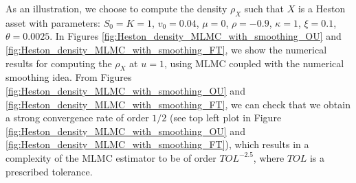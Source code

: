 As an illustration, we choose to compute the density $\rho_{X}$  such that $X$ is a Heston asset with parameters: $S_0=K=1$, $v_0=0.04$, $\mu=0$,  $\rho=-0.9$, $\kappa=1$, $\xi=0.1$, $\theta=0.0025$.  In Figures \ref{fig:Heston_density_MLMC_with_smoothing_OU} and \ref{fig:Heston_density_MLMC_with_smoothing_FT}, we show the numerical results  for computing the $\rho_{X}$ at $u=1$, using  MLMC coupled with the numerical smoothing idea. From Figures \ref{fig:Heston_density_MLMC_with_smoothing_OU} and \ref{fig:Heston_density_MLMC_with_smoothing_FT}, we can check that we obtain a strong convergence rate of order $1/2$ (see  top left plot in Figure \ref{fig:Heston_density_MLMC_with_smoothing_OU} and \ref{fig:Heston_density_MLMC_with_smoothing_FT}), which results in a complexity of the MLMC estimator to be of order $TOL^{-2.5}$, where $TOL$ is a prescribed tolerance.

